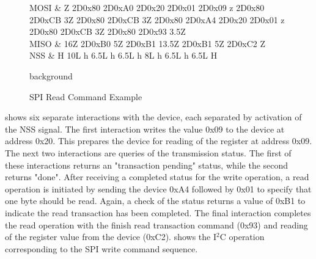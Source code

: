 \begin{figure*}
\centering
	\begin{tikztimingtable}[
		xscale=1.2,
		yscale=1.5,
		timing/name/.style={font=\normalfont},
		timing/table/header/.style={font=\normalfont},
		timing/x/.style={black},
		timing/z/.style={black},
		timing/slope=0.2,
		timing/c/no arrows,
		timing/c/arrow tip=stealth,
		timing/c/arrow pos=0.75,
	    	]
    	MOSI 		& Z 2D{0x80} 2D{0xA0} 2D{0x20} 2D{0x01} 2D{0x09} z 2D{0x80} 2D{0xCB} 3Z 2D{0x80} 2D{0xCB} 3Z 2D{0x80} 2D{0xA4} 2D{0x20} 2D{0x01} z 2D{0x80} 2D{0xCB} 3Z 2D{0x80} 2D{0x93} 3.5Z \\
	MISO		& 16Z 2D{0xB0} 5Z 2D{0xB1} 13.5Z 2D{0xB1} 5Z 2D{0xC2} Z\\
	NSS		& H 10L h 6.5L h 6.5L h 8L h 6.5L h 6.5L H\\
    	\extracode
	\begin{pgfonlayer}{background}
    	\end{pgfonlayer}
    \end{tikztimingtable}
    \caption{SPI Read Command Example}
    \label{fig:spireadexample}
\end{figure*}


 shows six separate interactions with the device, each separated by activation of the NSS signal. The first interaction writes the value 0x09 to the device at address 0x20. This prepares the device for reading of the register at address 0x09. The next two interactions are queries of the transmission status. The first of these interactions returns an "transaction pending" status, while the second returns "done". After receiving a completed status for the write operation, a read operation is initiated by sending the device 0xA4 followed by 0x01 to specify that one byte should be read. Again, a check of the status returns a value of 0xB1 to indicate the read transaction has been completed. The final interaction completes the read operation with the finish read transaction command (0x93) and reading of the register value from the device (0xC2).  shows the I$^2$C operation corresponding to the SPI write command sequence.


